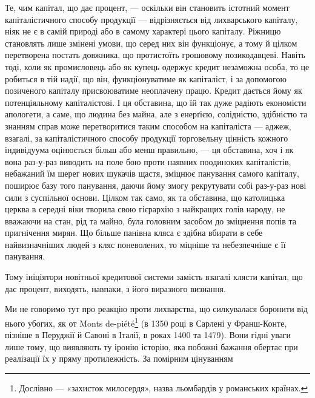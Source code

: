 Те, чим капітал, що дає процент, — оскільки він становить істотний момент
капіталістичного способу продукції — відрізняється від лихварського капіталу,
ніяк не є в самій природі або в самому характері цього капіталу. Ріжницю становлять
лише змінені умови, що серед них він функціонує, а тому й цілком
перетворена постать довжника, що протистоїть грошовому позикодавцеві. Навіть
тоді, коли як промисловець або як купець одержує кредит незаможна особа, то
це робиться в тій надії, що він, функціонуватиме як капіталіст, і за допомогою
позиченого капіталу присвоюватиме неоплачену працю. Кредит дається йому як
потенціяльному капіталістові. І ця обставина, що їй так дуже радіють економісти
апологети, а саме, що людина без майна, але з енерґією, солідністю, здібністю
та знанням справ може перетворитися таким способом на капіталіста — аджеж,
взагалі, за капіталістичного способу продукції торговельну цінність кожного
індивідуума оцінюється більш або менш правильно, — ця обставина, хоч і як
вона раз-у-раз виводить на поле бою проти наявних поодиноких капіталістів,
небажаний їм шерег нових шукачів щастя, зміцнює панування самого капіталу,
поширює базу того панування, даючи йому змогу рекрутувати собі раз-у-раз
нові сили з суспільної основи. Цілком так само, як та обставина, що католицька
церква в середні віки творила свою гієрархію з найкращих голів народу, не
вважаючи на стан, рід та майно, була головним засобом до зміцнення попів та
пригнічення мирян. Що більше панівна кляса є здібна вбирати в себе найвизначніших
людей з кляс поневолених, то міцніше та небезпечніше є її панування.

Тому ініціятори новітньої кредитової системи замість взагалі клясти капітал,
що дає процент, виходять, навпаки, з його виразного визнання.

Ми не говоримо тут про реакцію проти лихварства, що силкувалася боронити
від нього убогих, як от Monts de-piété\footnote*{
Дослівно — «захисток милосердя», назва льомбардів у романських країнах. 
} (в 1350 році в Сарлені у Франш-Конте,
пізніше в Перуджії й Савоні в Італії, в роках 1400 та 1479). Вони
гідні уваги лише тому, що виявляють ту іронію історію, яка побожні бажання
обертає при реалізації їх у пряму протилежність. За помірним цінуванням
\parbreak{}  %
